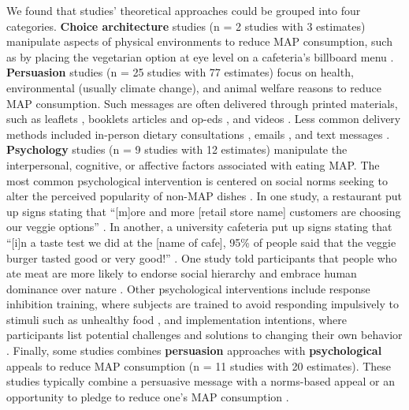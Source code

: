 \documentclass[sn-nature,referee,pdflatex]{sn-jnl}
\begin{document}
We found that studies' theoretical approaches could be grouped into four
categories. \textbf{Choice architecture} studies
\citep{andersson2021, kanchanachitra2020} (n = 2 studies with 3
estimates) manipulate aspects of physical environments to reduce MAP
consumption, such as by placing the vegetarian option at eye level on a
cafeteria's billboard menu \citep{andersson2021}. \textbf{Persuasion}
studies
\citep{kanchanachitra2020, aberman2018, abrahamse2007, acharya2004, banerjee2019, bianchi2022, bochmann2017, bschaden2020, carfora2023, hennessy2016, piester2020, cooney2014, cooney2016, feltz2022, haile2021, hatami2018, jalil2023, mathur2021effectiveness, merrill2009, norris2014, peacock2017, polanco2022, sparkman2021, weingarten2022}
(n = 25 studies with 77 estimates) focus on health, environmental
(usually climate change), and animal welfare reasons to reduce MAP
consumption. Such messages are often delivered through printed
materials, such as leaflets \citep{haile2021, polanco2022}, booklets
\citep{bianchi2022} articles and op-eds \citep{sparkman2021, feltz2022},
and videos \citep{sparkman2021, cooney2016, mathur2021effectiveness}.
Less common delivery methods included in-person dietary consultations
\citep{merrill2009}, emails \citep{banerjee2019}, and text messages
\citep{carfora2023}. \textbf{Psychology} studies
\citep{aldoh2023, allen2002, camp2019, coker2022, piester2020, sparkman2020}
(n = 9 studies with 12 estimates) manipulate the interpersonal,
cognitive, or affective factors associated with eating MAP. The most
common psychological intervention is centered on social norms seeking to
alter the perceived popularity of non-MAP dishes \citep{sparkman2020}.
In one study, a restaurant put up signs stating that ``{[}m{]}ore and
more {[}retail store name{]} customers are choosing our veggie options''
\citep{coker2022}. In another, a university cafeteria put up signs
stating that ``{[}i{]}n a taste test we did at the {[}name of cafe{]},
95\% of people said that the veggie burger tasted good or very good!''
\citep{piester2020}. One study told participants that people who ate
meat are more likely to endorse social hierarchy and embrace human
dominance over nature \citep{allen2002}. Other psychological
interventions include response inhibition training, where subjects are
trained to avoid responding impulsively to stimuli such as unhealthy
food \citep{camp2019}, and implementation intentions, where participants
list potential challenges and solutions to changing their own behavior
\citep{aberman2018, shreedhar2021}. Finally, some studies combines
\textbf{persuasion} approaches with \textbf{psychological} appeals to
reduce MAP consumption
\citep{aberman2018, berndsen2005, bertolaso2015, carfora2023, fehrenbach2015, hennessy2016, mathur2021effectiveness, mattson2020, piester2020, shreedhar2021}
(n = 11 studies with 20 estimates). These studies typically combine a
persuasive message with a norms-based appeal
\citep{piester2020, mattson2020} or an opportunity to pledge to reduce
one's MAP consumption \citep{mathur2021effectiveness, shreedhar2021}.
\end{document}
